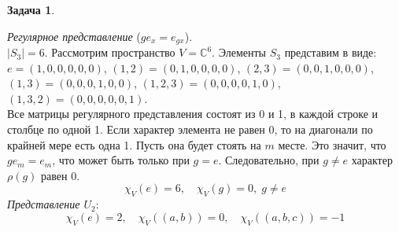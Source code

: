 \documentclass[12pt]{article}
\theoremstyle{definition}
\newtheorem{zad}{Задача}[section]
\begin{document}
\begin{zad}
\begin{itemize}
\begin{equation}
    \end{equation}
    \textit{Регулярное представление} ($ge_x=e_{gx}$).\\
    $|S_3|=6$. Рассмотрим пространство $V=\mathbb{C}^6$. Элементы $S_3$ представим в виде: $e=(1,0,0,0,0,0)$, $(1,2)=(0,1,0,0,0,0)$, $(2,3)=(0,0,1,0,0,0)$, $(1,3)=(0,0,0,1,0,0)$, $(1,2,3)=(0,0,0,0,1,0)$, $(1,3,2)=(0,0,0,0,0,1)$.\\
    Все матрицы регулярного представления состоят из 0 и 1, в каждой строке и столбце по одной 1. Если характер элемента не равен 0, то на диагонали по крайней мере есть одна 1. Пусть она будет стоять на $m$ месте. Это значит, что $ge_m=e_m$, что может быть только при $g=e$. Следовательно, при $g\neq e$ характер $\rho(g)$ равен 0.
    \begin{equation}
        \boxed{\chi_V(e)=6,\quad \chi_V(g)=0,\;g\neq e}
    \end{equation}
    \textit{Представление $U_2$}:
    \begin{equation}
        \boxed{\chi_V(e)=2,\quad\chi_V((a,b))=0,\quad\chi_V((a,b,c))=-1}
    \end{equation}
\end{itemize}
\end{zad}
\end{document}
